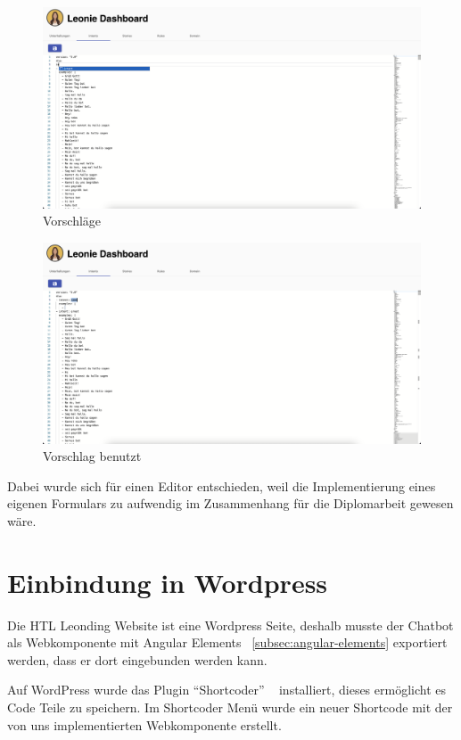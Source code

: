 \begin{figure}[hbt!]
    \centering
    \includegraphics[scale=0.2]{pics/dashboardCodeSuggestion}
    \caption{Vorschläge}
    \label{fig:impl:dashboardCodeSuggestion}
\end{figure}
\begin{figure}[hbt!]
    \centering
    \includegraphics[scale=0.2]{pics/dashboardSuggestionMade}
    \caption{Vorschlag benutzt}
    \label{fig:impl:dashboardCodeSuggestionMade}
\end{figure}

Dabei wurde sich für einen Editor entschieden, weil die Implementierung eines eigenen Formulars zu aufwendig im Zusammenhang für die Diplomarbeit gewesen wäre.

\section{Einbindung in Wordpress}
Die HTL Leonding Website ist eine Wordpress Seite, deshalb musste der Chatbot als Webkomponente mit Angular Elements ~\ref{subsec:angular-elements} exportiert werden, dass er dort eingebunden werden kann.

Auf WordPress wurde das Plugin ``Shortcoder'' ~\cite{shortcoder} installiert, dieses ermöglicht es Code Teile zu speichern.
Im Shortcoder Menü wurde ein neuer Shortcode mit der von uns implementierten Webkomponente erstellt.

